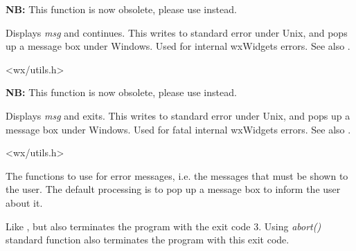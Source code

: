 {\bf NB:} This function is now obsolete, please use 
instead.

Displays {\it msg} and continues. This writes to standard error under
Unix, and pops up a message box under Windows. Used for internal
wxWidgets errors. See also .


<wx/utils.h>


\label{wxfatalerror}


{\bf NB:} This function is now obsolete, please use
 instead.

Displays {\it msg} and exits. This writes to standard error under Unix,
and pops up a message box under Windows. Used for fatal internal
wxWidgets errors. See also .


<wx/utils.h>


\label{wxlogerror}



The functions to use for error messages, i.e. the messages that must be shown
to the user. The default processing is to pop up a message box to inform the
user about it.


\label{wxlogfatalerror}



Like , but also
terminates the program with the exit code 3. Using {\it abort()} standard
function also terminates the program with this exit code.


\label{wxlogwarning}



